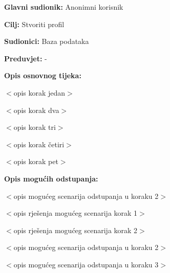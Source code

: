 \noindent {}
\begin{packed_item}

\item \textbf{Glavni sudionik:} Anonimni korisnik
\item  \textbf{Cilj:} Stvoriti profil
\item  \textbf{Sudionici:} Baza podataka
\item  \textbf{Preduvjet:} -
\item  \textbf{Opis osnovnog tijeka:}

\item[] \begin{packed_enum}

    \item $<$opis korak jedan$>$
    \item $<$opis korak dva$>$
    \item $<$opis korak tri$>$
    \item $<$opis korak četiri$>$
    \item $<$opis korak pet$>$

\end{packed_enum}

\item  \textbf{Opis mogućih odstupanja:}

\item[] \begin{packed_item}

    \item[2.a] $<$opis mogućeg scenarija odstupanja u koraku 2$>$

    \item[] \begin{packed_enum}

        \item $<$opis rješenja mogućeg scenarija korak 1$>$
        \item $<$opis rješenja mogućeg scenarija korak 2$>$

    \end{packed_enum}

\item[2.b] $<$opis mogućeg scenarija odstupanja u koraku 2$>$
\item[3.a] $<$opis mogućeg scenarija odstupanja  u koraku 3$>$

\end{packed_item}

\end{packed_item}

